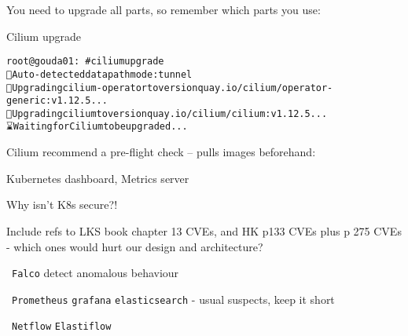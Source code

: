 \documentclass[Screen16to9,17pt]{foils}
\begin{document}


\begin{quote}

\end{quote}

You need to upgrade all parts, so remember which parts you use:
\begin{list2}
\item
\item Cilium upgrade
\end{list2}

\slide{}


\begin{alltt}
root@gouda01:~# cilium upgrade
🔮 Auto-detected datapath mode: tunnel
🚀 Upgrading cilium-operator to version quay.io/cilium/operator-generic:v1.12.5...
🚀 Upgrading cilium to version quay.io/cilium/cilium:v1.12.5...
⌛ Waiting for Cilium to be upgraded...

\end{alltt}

\begin{list2}
    \item
\end{list2}

Cilium recommend a pre-flight check -- pulls images beforehand:\\


\begin{list2}
\item Kubernetes dashboard, Metrics server
\end{list2}


Why isn't K8s secure?!
\begin{list2}
\item Include refs to LKS book chapter 13 CVEs, and HK p133 CVEs plus p 275 CVEs
- which ones would hurt our design and architecture?
\end{list2}


\begin{list2}
\item \faWrench\ \verb+Falco+ detect anomalous behaviour
\item \faWrench\ \verb+Prometheus+ \verb+grafana+ \verb+elasticsearch+ - usual suspects, keep it short
\item \faWrench\ \verb+Netflow+ \verb+Elastiflow+
\end{list2}
\end{document}
